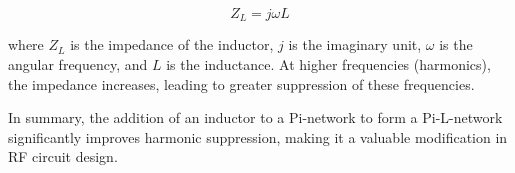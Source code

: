 \[
Z_L = j\omega L
\]

where \( Z_L \) is the impedance of the inductor, \( j \) is the imaginary unit, \( \omega \) is the angular frequency, and \( L \) is the inductance. At higher frequencies (harmonics), the impedance increases, leading to greater suppression of these frequencies.

In summary, the addition of an inductor to a Pi-network to form a Pi-L-network significantly improves harmonic suppression, making it a valuable modification in RF circuit design.

